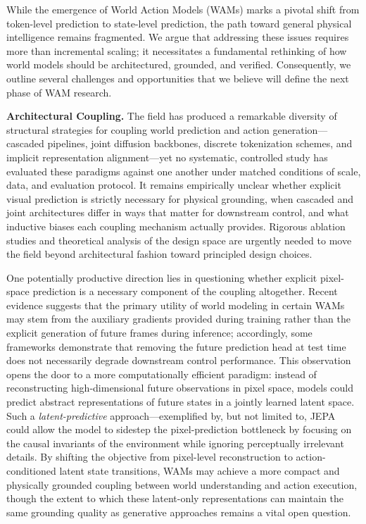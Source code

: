 \label{sec:open}


\newcommand{\highlightpara}[1]{\textbf{\textcolor{openmossblue}{#1}}}



While the emergence of World Action Models (WAMs) marks a pivotal shift from token-level prediction to state-level prediction, the path toward general physical intelligence remains fragmented. We argue that addressing these issues requires more than incremental scaling; it necessitates a fundamental rethinking of how world models should be architectured, grounded, and verified. Consequently, we outline several challenges and opportunities that we believe will define the next phase of WAM research.


\highlightpara{Architectural Coupling.} The field has produced a remarkable diversity of structural strategies for coupling world prediction and action generation---cascaded pipelines, joint diffusion backbones, discrete tokenization schemes, and implicit representation alignment---yet no systematic, controlled study has evaluated these paradigms against one another under matched conditions of scale, data, and evaluation protocol. It remains empirically unclear whether explicit visual prediction is strictly necessary for physical grounding, when cascaded and joint architectures differ in ways that matter for downstream control, and what inductive biases each coupling mechanism actually provides. Rigorous ablation studies and theoretical analysis of the design space are urgently needed to move the field beyond architectural fashion toward principled design choices.



One potentially productive direction lies in questioning whether explicit pixel-space prediction is a necessary component of the coupling altogether. Recent evidence suggests that the primary utility of world modeling in certain WAMs may stem from the auxiliary gradients provided during training rather than the explicit generation of future frames during inference; accordingly, some frameworks demonstrate that removing the future prediction head at test time does not necessarily degrade downstream control performance. This observation opens the door to a more computationally efficient paradigm: instead of reconstructing high-dimensional future observations in pixel space, models could predict abstract representations of future states in a jointly learned latent space. Such a \textit{latent-predictive} approach—exemplified by, but not limited to, JEPA could allow the model to sidestep the pixel-prediction bottleneck by focusing on the causal invariants of the environment while ignoring perceptually irrelevant details. By shifting the objective from pixel-level reconstruction to action-conditioned latent state transitions, WAMs may achieve a more compact and physically grounded coupling between world understanding and action execution, though the extent to which these latent-only representations can maintain the same grounding quality as generative approaches remains a vital open question.



